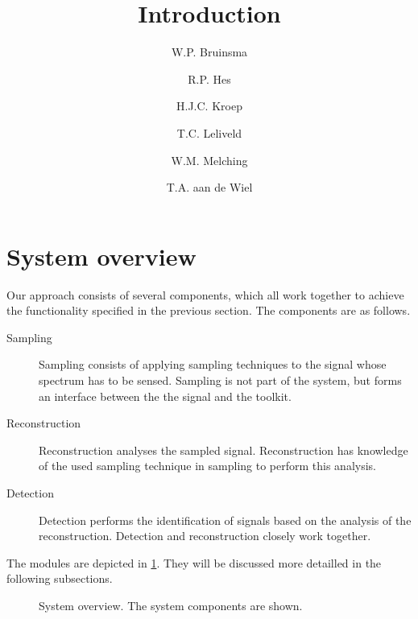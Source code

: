 \documentclass[a4paper, openany, oneside]{memoir}
\title{Introduction}
\author{W.P. Bruinsma \and R.P. Hes \and H.J.C. Kroep \and T.C. Leliveld \and W.M. Melching \and T.A. aan de Wiel}
\begin{document}
\section{System overview}
Our approach consists of several components, which all work together to achieve the functionality specified in the previous section. The components are as follows.

\begin{description}
    \item[Sampling] Sampling consists of applying sampling techniques to the signal whose spectrum has to be sensed. Sampling is not part of the system, but forms an interface between the the signal and the toolkit.
    \item[Reconstruction] Reconstruction analyses the sampled signal. Reconstruction has knowledge of the used sampling technique in sampling to perform this analysis.
    \item[Detection] Detection performs the identification of signals based on the analysis of the reconstruction. Detection and reconstruction closely work together.
\end{description}

The modules are depicted in \cref{fig:overview}. They will be discussed more detailled in the following subsections.
\begin{figure}
    \centering
    \caption{System overview. The system components are shown.}
    \label{fig:overview}
\end{figure}
\end{document}
